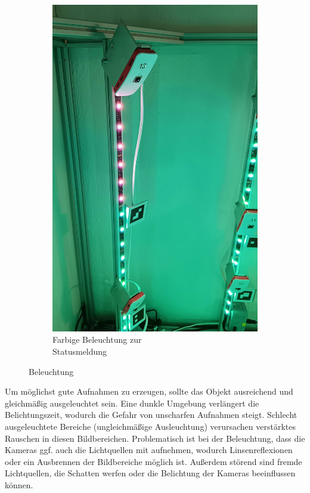 \documentclass[./00PhotoBox.tex]{subfiles}
\begin{document}
\begin{figure}
\begin{subfigure}{0.45\textwidth}
        \includegraphics[height=1.2\linewidth]{./img/3_aufbau/beleuchtung_farbig.jpg}
        \centering
        \caption{Farbige Beleuchtung zur\\Statusmeldung}
        \label{img:led_farbig}
    \end{subfigure}
    \caption{Beleuchtung}
\end{figure}

Um möglichst gute Aufnahmen zu erzeugen, sollte das Objekt ausreichend und gleichmäßig ausgeleuchtet sein. Eine dunkle Umgebung verlängert die Belichtungszeit, wodurch die Gefahr von unscharfen Aufnahmen steigt. Schlecht ausgeleuchtete Bereiche (ungleichmäßige Ausleuchtung) verursachen verstärktes Rauschen in diesen Bildbereichen. Problematisch ist bei der Beleuchtung, dass die Kameras ggf. auch die Lichtquellen mit aufnehmen, wodurch Linsenreflexionen oder ein Ausbrennen der Bildbereiche möglich ist. Außerdem störend sind fremde Lichtquellen, die Schatten werfen oder die Belichtung der Kameras beeinflussen können.
\end{document}
